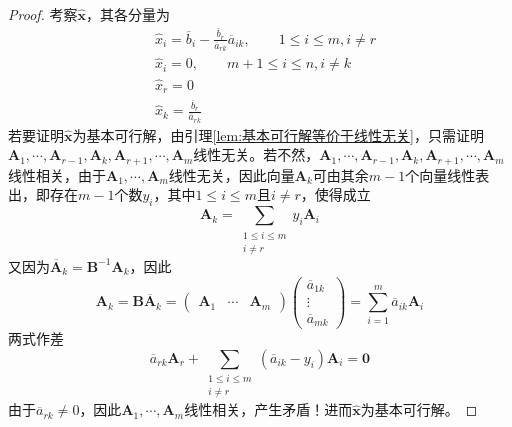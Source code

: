 \documentclass[lang = cn, scheme = chinese, thmcnt = section]{elegantbook}
\newcommand{\bs}{\boldsymbol}          %
\begin{document}
\begin{proof}
	考察$\hat{\bs{x}}$，其各分量为
	\begin{align*}
		& \hat{x}_i = \overline{b}_i-\frac{\overline{b}_r}{\overline{a}_{rk}}\overline{a}_{ik},\qquad 1\le i \le m,i\ne r\\
		& \hat{x}_i = 0,\qquad m+1\le i \le n,i\ne k\\
		& \hat{x}_r = 0\\
		& \hat{x}_k = \frac{\overline{b}_r}{\overline{a}_{rk}}
	\end{align*}
	若要证明$\hat{\bs{x}}$为基本可行解，由引理\ref{lem:基本可行解等价于线性无关}，只需证明$\bs{A}_1,\cdots,\bs{A}_{r-1},\bs{A}_k,\bs{A}_{r+1},\cdots,\bs{A}_m$线性无关。若不然，$\bs{A}_1,\cdots,\bs{A}_{r-1},\bs{A}_k,\bs{A}_{r+1},\cdots,\bs{A}_m$线性相关，由于$\bs{A}_1,\cdots,\bs{A}_m$线性无关，因此向量$\bs{A}_k$可由其余$m-1$个向量线性表出，即存在$m-1$个数$y_i$，其中$1\le i\le m$且$i\ne r$，使得成立
	$$
	\bs{A}_k=\sum_{\substack{1\le i\le m\\i\ne r}}y_i\bs{A}_i
	$$
	又因为$\overline{\bs{A}}_k=\bs{B}^{-1}\bs{A}_k$，因此
	$$
	\bs{A}_k
	=\bs{B}\overline{\bs{A}}_k
	=\begin{pmatrix}
		\bs{A}_1 & \cdots & \bs{A}_m
	\end{pmatrix}
	\begin{pmatrix}
		\overline{a}_{1k}\\\vdots\\\overline{a}_{mk}
	\end{pmatrix}
	=\sum_{i=1}^{m}\overline{a}_{ik}\bs{A}_i
	$$
	两式作差
	$$
	\overline{a}_{rk}\bs{A}_r
	+\sum_{\substack{1\le i\le m\\i\ne r}}(\overline{a}_{ik}-y_i)\bs{A}_i
	=\bs{0}
	$$
	由于$\overline{a}_{rk}\ne 0$，因此$\bs{A}_1,\cdots,\bs{A}_m$线性相关，产生矛盾！进而$\hat{\bs{x}}$为基本可行解。
	

\end{proof}
\end{document}
